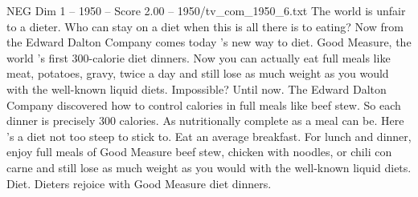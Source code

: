 \begin{textsample}{NEG Dim 1 – 1950 – Score 2.00 – 1950/tv\_com\_1950\_6.txt}  \label{ex:f1_neg_085}
The world is unfair to a dieter.
Who can stay on a diet when this is all there is to eating?
Now from the Edward Dalton Company comes today 's new way to diet.
Good Measure, the world 's first 300-calorie diet dinners.
Now you can actually eat full meals like meat, potatoes, gravy, twice a day and still lose as much weight as you would with the well-known liquid diets.
Impossible?
Until now.
The Edward Dalton Company discovered how to control calories in full meals like beef stew.
So each dinner is precisely 300 calories.
As nutritionally complete as a meal can be.
Here 's a diet not too steep to stick to.
Eat an average breakfast.
For lunch and dinner, enjoy full meals of Good Measure beef stew, chicken with noodles, or chili con carne and still lose as much weight as you would with the well-known liquid diets.
Diet.
Dieters rejoice with Good Measure diet dinners.

\end{textsample}
